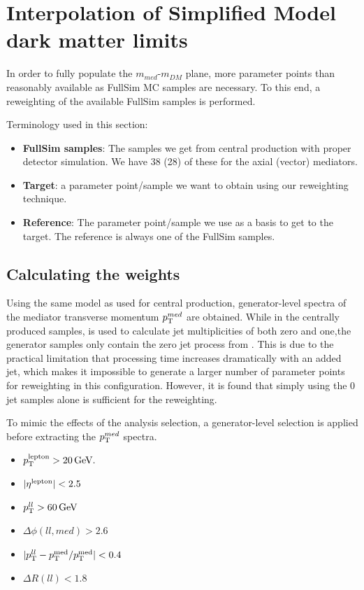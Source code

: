 \chapter{Interpolation of Simplified Model dark matter limits}
\label{app:interpolation}

In order to fully populate the $m_{med}$-$m_{DM}$ plane, more parameter points than reasonably available as FullSim MC samples are necessary.
To this end, a reweighting of the available FullSim samples is performed.

Terminology used in this section:
\begin{itemize}
\item \textbf{FullSim samples}: The samples we get from central production with proper detector simulation. We have 38 (28) of these for the axial (vector) mediators.
\item \textbf{Target}: a parameter point/sample we want to obtain using our reweighting technique.
\item \textbf{Reference}: The parameter point/sample we use as a basis to get to the target. The reference is always one of the FullSim samples.
\end{itemize}

\section{Calculating the weights}
Using the same \MADGRAPH model as used for central production, generator-level spectra of the mediator transverse momentum $p_{\mathrm{T}}^{med}$ are obtained.
While in the centrally produced samples, \MADGRAPH is used to calculate jet multiplicities of both zero and one,the generator samples only contain the zero jet process from \MADGRAPH. 
This is due to the practical limitation that processing time increases dramatically with an added jet, which makes it impossible to
generate a larger number of parameter points for reweighting in this configuration. However, it is found that simply using the 0 jet samples alone is sufficient for the reweighting.

To mimic the effects of the analysis selection, a generator-level selection is applied before extracting the $p_{\mathrm{T}}^{med}$ spectra.

\begin{itemize}
\item $p_{\mathrm{T}}^{\rm lepton} > 20 \,\text{Ge\hspace{-.08em}V}.             $
\item $|\eta^{\rm lepton}| < 2.5               $
\item $p_{\mathrm{T}}^{ll} > 60 \,\text{Ge\hspace{-.08em}V}                      $
\item $\Delta\phi(ll,med) > 2.6                $
\item $|p_{\mathrm{T}}^{ll} - p_{\mathrm{T}}^{\rm med} / p_{\mathrm{T}}^{\rm med}| < 0.4$
\item $\Delta R (ll) < 1.8$
\end{itemize}

